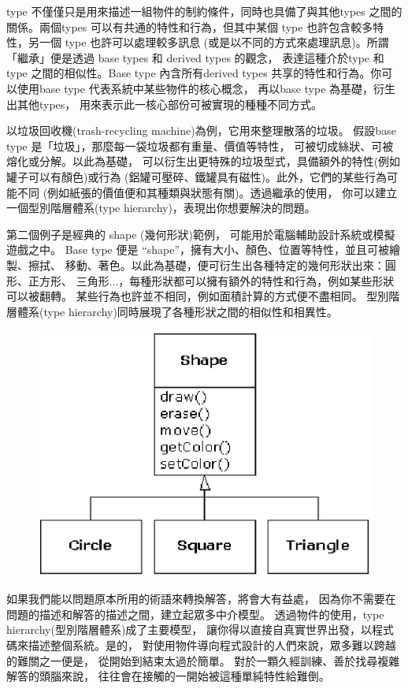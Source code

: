 type 不僅僅只是用來描述一組物件的制約條件，同時也具備了與其他types
之間的關係。兩個types 可以有共通的特性和行為，但其中某個 type
也許包含較多特性，另一個 type 也許可以處理較多訊息
(或是以不同的方式來處理訊息)。所謂「繼承」便是透過 base types 和
derived types 的觀念，
表達這種介於type 和type 之間的相似性。Base type 內含所有derived
types 共享的特性和行為。你可以使用base type 代表系統中某些物件的核心概念，
再以base type 為基礎，衍生出其他types，
用來表示此一核心部份可被實現的種種不同方式。

以垃圾回收機(trash-recycling machine)為例，它用來整理散落的垃圾。
假設base type 是「垃圾」，那麼每一袋垃圾都有重量、價值等特性，
可被切成絲狀、可被熔化或分解。以此為基礎，
可以衍生出更特殊的垃圾型式，具備額外的特性(例如罐子可以有顏色)或行為
(鋁罐可壓碎、鐵罐具有磁性)。此外，它們的某些行為可能不同
(例如紙張的價值便和其種類與狀態有關)。透過繼承的使用，
你可以建立一個型別階層體系(type hierarchy)，表現出你想要解決的問題。

第二個例子是經典的 shape (幾何形狀)範例，
可能用於電腦輔助設計系統或模擬遊戲之中。
Base type 便是 ``shape''，擁有大小、顏色、位置等特性，並且可被繪製、擦拭、
移動、著色。以此為基礎，便可衍生出各種特定的幾何形狀出來：圓形、正方形、
三角形...，每種形狀都可以擁有額外的特性和行為，例如某些形狀可以被翻轉。
某些行為也許並不相同，例如面積計算的方式便不盡相同。
型別階層體系(type hierarchy)同時展現了各種形狀之間的相似性和相異性。

\begin{figure}[htbp]
\centering
\includegraphics{eps/TIJ206.eps}
\end{figure}

如果我們能以問題原本所用的術語來轉換解答，將會大有益處，
因為你不需要在問題的描述和解答的描述之間，建立起眾多中介模型。
透過物件的使用，type hierarchy(型別階層體系)成了主要模型，
讓你得以直接自真實世界出發，以程式碼來描述整個系統。是的，
對使用物件導向程式設計的人們來說，眾多難以跨越的難關之一便是，
從開始到結束太過於簡單。 對於一顆久經訓練、善於找尋複雜解答的頭腦來說，
往往會在接觸的一開始被這種單純特性給難倒。

